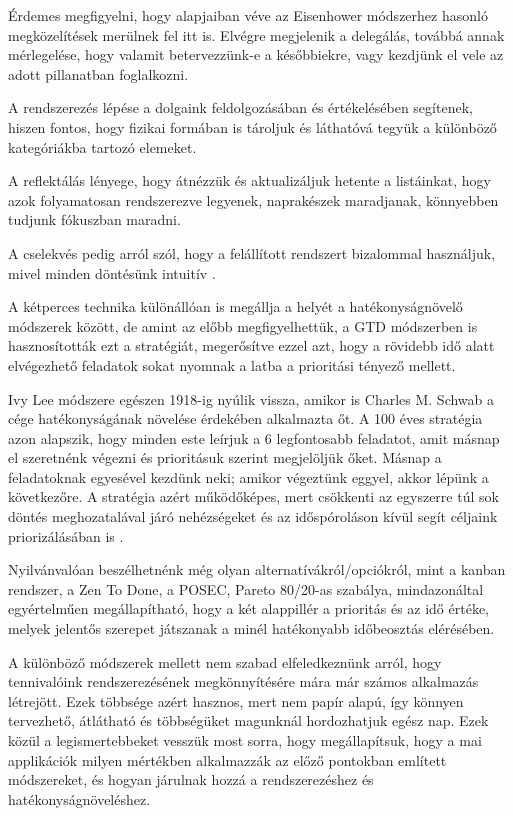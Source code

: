 Érdemes megfigyelni, hogy alapjaiban véve az Eisenhower módszerhez hasonló megközelítések merülnek fel itt is. Elvégre megjelenik a delegálás, továbbá annak mérlegelése, hogy valamit betervezzünk-e a későbbiekre, vagy kezdjünk el vele az adott pillanatban foglalkozni.

A rendszerezés lépése a dolgaink feldolgozásában és értékelésében segítenek, hiszen fontos, hogy fizikai formában is tároljuk és láthatóvá tegyük a különböző kategóriákba tartozó elemeket.

A reflektálás lényege, hogy átnézzük és aktualizáljuk hetente a listáinkat, hogy azok folyamatosan rendszerezve legyenek, naprakészek maradjanak, könnyebben tudjunk fókuszban maradni.

A cselekvés pedig arról szól, hogy a felállított rendszert bizalommal használjuk, mivel minden döntésünk intuitív \cite{gtd}.

\label{sec:twominutes}

A kétperces technika különállóan is megállja a helyét a hatékonyságnövelő módszerek között, de amint az előbb megfigyelhettük, a GTD módszerben is hasznosították ezt a stratégiát, megerősítve ezzel azt, hogy a rövidebb idő alatt elvégezhető feladatok sokat nyomnak a latba a prioritási tényező mellett.


Ivy Lee módszere egészen 1918-ig nyúlik vissza, amikor is Charles M. Schwab a cége hatékonyságának növelése érdekében alkalmazta őt. A 100 éves stratégia azon alapszik, hogy minden este leírjuk a 6 legfontosabb feladatot, amit másnap el szeretnénk végezni és prioritásuk szerint megjelöljük őket. Másnap a feladatoknak egyesével kezdünk neki; amikor végeztünk eggyel, akkor lépünk a következőre. A stratégia azért működőképes, mert csökkenti az egyszerre túl sok döntés meghozatalával járó nehézségeket és az időspóroláson kívül segít céljaink priorizálásában is \cite{ivylee}.

Nyilvánvalóan beszélhetnénk még olyan alternatívákról/opciókról, mint a kanban rendszer, a Zen To Done, a POSEC, Pareto 80/20-as szabálya, mindazonáltal egyértelműen megállapítható, hogy a két alappillér a prioritás és az idő értéke, melyek jelentős szerepet játszanak a minél hatékonyabb időbeosztás elérésében.


A különböző módszerek mellett nem szabad elfeledkeznünk arról, hogy tennivalóink rendszerezésének megkönnyítésére mára már számos alkalmazás  létrejött. Ezek többsége azért hasznos, mert nem papír alapú, így könnyen tervezhető, átlátható és többségüket magunknál hordozhatjuk egész nap. Ezek közül a legismertebbeket vesszük most sorra, hogy megállapítsuk, hogy a mai applikációk milyen mértékben alkalmazzák az előző pontokban említett módszereket, és hogyan járulnak hozzá a rendszerezéshez és hatékonyságnöveléshez.

